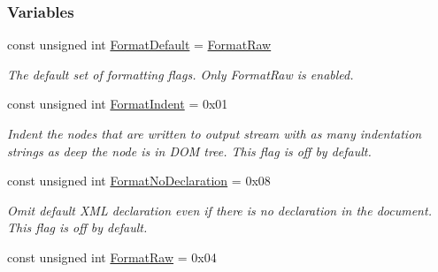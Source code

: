 \subsubsection*{Variables}
\begin{DoxyCompactItemize}
\item 
\hypertarget{namespaceMezzanine_1_1xml_ad6b5ebd9ea7799aba19391495e2b09e5}{
const unsigned int \hyperlink{namespaceMezzanine_1_1xml_ad6b5ebd9ea7799aba19391495e2b09e5}{FormatDefault} = \hyperlink{namespaceMezzanine_1_1xml_a92396af17ca2c698180d7394362b9a70}{FormatRaw}}
\label{namespaceMezzanine_1_1xml_ad6b5ebd9ea7799aba19391495e2b09e5}

\begin{DoxyCompactList}\small\item\em The default set of formatting flags. Only FormatRaw is enabled. \item\end{DoxyCompactList}\item 
\hypertarget{namespaceMezzanine_1_1xml_a70e77a101c278236eeb7eb3c40f56184}{
const unsigned int \hyperlink{namespaceMezzanine_1_1xml_a70e77a101c278236eeb7eb3c40f56184}{FormatIndent} = 0x01}
\label{namespaceMezzanine_1_1xml_a70e77a101c278236eeb7eb3c40f56184}

\begin{DoxyCompactList}\small\item\em Indent the nodes that are written to output stream with as many indentation strings as deep the node is in DOM tree. This flag is off by default. \item\end{DoxyCompactList}\item 
\hypertarget{namespaceMezzanine_1_1xml_a24412cfad59b402e85cbe6ad5093917a}{
const unsigned int \hyperlink{namespaceMezzanine_1_1xml_a24412cfad59b402e85cbe6ad5093917a}{FormatNoDeclaration} = 0x08}
\label{namespaceMezzanine_1_1xml_a24412cfad59b402e85cbe6ad5093917a}

\begin{DoxyCompactList}\small\item\em Omit default XML declaration even if there is no declaration in the document. This flag is off by default. \item\end{DoxyCompactList}\item 
\hypertarget{namespaceMezzanine_1_1xml_a92396af17ca2c698180d7394362b9a70}{
const unsigned int \hyperlink{namespaceMezzanine_1_1xml_a92396af17ca2c698180d7394362b9a70}{FormatRaw} = 0x04}
\label{namespaceMezzanine_1_1xml_a92396af17ca2c698180d7394362b9a70}


\end{DoxyCompactItemize}
